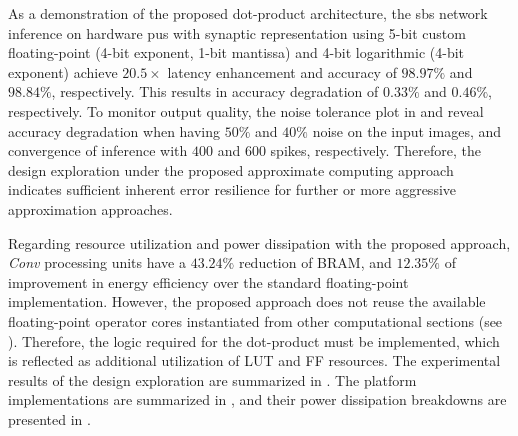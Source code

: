 As a demonstration of the proposed dot-product architecture, the \gls{sbs} network inference on hardware \glspl{pu} with synaptic representation using 5-bit custom floating-point (4-bit exponent, 1-bit mantissa) and 4-bit logarithmic (4-bit exponent) achieve $20.5\times$ latency enhancement and accuracy of $98.97\%$ and $98.84\%$, respectively. This results in accuracy degradation of $0.33\%$ and $0.46\%$, respectively. To monitor output quality, the noise tolerance plot in  and  reveal accuracy degradation when having $50\%$ and $40\%$ noise on the input images, and convergence of inference with $400$ and $600$ spikes, respectively. Therefore, the design exploration under the proposed approximate computing approach indicates sufficient inherent error resilience for further or more aggressive approximation approaches.

Regarding resource utilization and power dissipation with the proposed approach, \emph{Conv} processing units have a $43.24\%$ reduction of BRAM, and $12.35\%$ of improvement in energy efficiency over the standard floating-point implementation. However, the proposed approach does not reuse the available floating-point operator cores instantiated from other computational sections (see {}). Therefore, the logic required for the dot-product must be implemented, which is reflected as additional utilization of LUT and FF resources. The experimental results of the design exploration are summarized in . The platform implementations are summarized in , and their power dissipation breakdowns are presented in .

